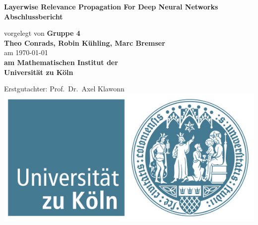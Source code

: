 \documentclass[11pt,a4paper]{scrbook}
\begin{document}
\begin{titlepage}
\begin{center}
\huge \textbf{{Layerwise Relevance Propagation For Deep Neural Networks}} \\
\vspace{2cm}
\LARGE\textbf{{Abschlussbericht}}\\
\vspace{2cm}
\normalsize


vorgelegt von  \textbf{Gruppe 4\\ Theo Conrads, Robin Kühling, Marc Bremser}\\
am \today \\
\vspace{2.5cm}
\textbf{am Mathematischen Institut der \\Universität zu Köln}\\
\vspace{3cm}
\end{center}
\normalsize{
\begin{center}
Erstgutachter:  {Prof.~Dr.~Axel Klawonn} \\
\vfill
\includegraphics[scale=0.25]{uzk_logo} %
\end{center}
}
\end{titlepage}


\pagestyle{plain}
\cleardoublepage
\setcounter{page}{1}
\tableofcontents

\listoffigures
{}

\listoftables
{}

\cleardoublepage












{}

%
\end{document}
